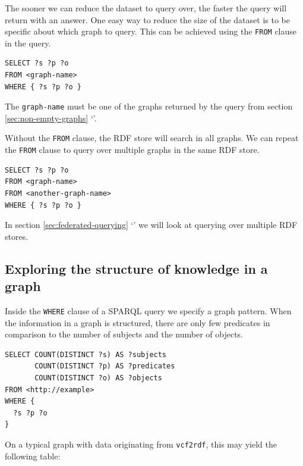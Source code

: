 \documentclass[11pt,a4paper,oneside]{book}
\begin{document}
  The sooner we can reduce the dataset to query over, the faster the query will
  return with an answer.  One easy way to reduce the size of the dataset is to
  be specific about which graph to query.  This can be achieved using the
  \texttt{FROM} clause in the query.

\begin{siderules}
\begin{verbatim}
SELECT ?s ?p ?o
FROM <graph-name>
WHERE { ?s ?p ?o }
\end{verbatim}
\end{siderules}

  The \texttt{graph-name} must be one of the graphs returned by the query from
  section \ref{sec:non-empty-graphs} {\color{LinkGray}%
    `'}.

  Without the \texttt{FROM} clause, the RDF store will search in all graphs.
  We can repeat the \texttt{FROM} clause to query over multiple graphs in the
  same RDF store.

\begin{siderules}
\begin{verbatim}
SELECT ?s ?p ?o
FROM <graph-name>
FROM <another-graph-name>
WHERE { ?s ?p ?o }
\end{verbatim}
\end{siderules}

  In section \ref{sec:federated-querying} {\color{LinkGray}%
  `'} we will look at querying over multiple
  RDF stores.

\subsection{Exploring the structure of knowledge in a graph}


  Inside the \texttt{WHERE} clause of a SPARQL query we specify a graph
  pattern.  When the information in a graph is structured, there are only few
  predicates in comparison to the number of subjects and the number of objects.

\begin{siderules}
\begin{verbatim}
SELECT COUNT(DISTINCT ?s) AS ?subjects
       COUNT(DISTINCT ?p) AS ?predicates
       COUNT(DISTINCT ?o) AS ?objects
FROM <http://example>
WHERE {
  ?s ?p ?o
}
\end{verbatim}
\end{siderules}

On a typical graph with data originating from \texttt{vcf2rdf}, this may yield
the following table:
\end{document}
